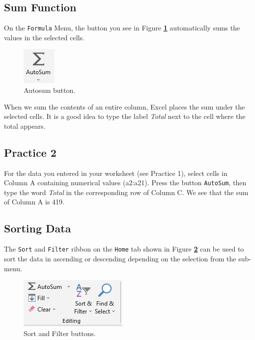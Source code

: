 \documentclass[
]{book}
\begin{document}
\hypertarget{sum-function}{%
\subsection{Sum Function}\label{sum-function}}

On the \texttt{Formula} Menu, the button you see in Figure \textbf{\ref{fig:autosum}} automatically sums the values in the selected cells.

\begin{figure}

{\centering \includegraphics[width=0.1\linewidth]{images/autosum} 

}

\caption{Autosum button.}\label{fig:autosum}
\end{figure}

When we sum the contents of an entire column, Excel places the sum under the selected cells. It is a good idea to type the label \emph{Total} next to the cell where the total appears.

\hypertarget{practice-2}{%
\subsection{Practice 2}\label{practice-2}}

For the data you entered in your worksheet (see Practice 1), select cells in Column A containing numerical values (a2:a21). Press the button \texttt{AutoSum}, then type the word \emph{Total} in the corresponding row of Column C. We see that the sum of Column A is 419.

\hypertarget{sorting-data}{%
\subsection{Sorting Data}\label{sorting-data}}

The \texttt{Sort} and \texttt{Filter} ribbon on the \texttt{Home} tab shown in Figure \textbf{\ref{fig:sorting}} can be used to sort the data in ascending or descending depending on the selection from the sub-menu.

\begin{figure}

{\centering \includegraphics[width=0.3\linewidth]{images/sorting} 

}

\caption{Sort and Filter buttons.}\label{fig:sorting}
\end{figure}
\end{document}
